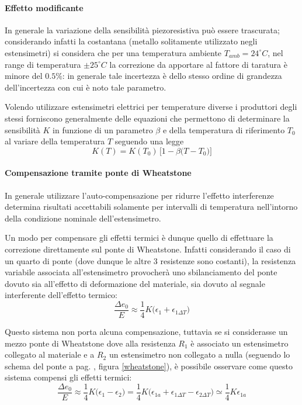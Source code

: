 		\paragraph{Effetto modificante} In generale la variazione della sensibilità piezoresistiva può essere trascurata; considerando infatti la costantana (metallo solitamente utilizzato negli estensimetri) si considera che per una temperatura ambiente $T_{amb} = 24^\circ C$, nel range di temperatura $\pm 25^\circ C$ la correzione da apportare al fattore di taratura è minore del $0.5\%$: in generale tale incertezza è dello stesso ordine di grandezza dell'incertezza con cui è noto tale parametro.
		
		Volendo utilizzare estensimetri elettrici per temperature diverse i produttori degli stessi forniscono generalmente delle equazioni che permettono di determinare la sensibilità $K$ in funzione di un parametro $\beta$ e della temperatura di riferimento $T_0$ al variare della temperatura $T$ seguendo una legge
		\[ K(T) = K(T_0) \, \Big[1 - \beta \big(T-T_0\big)\Big] \]
		
		\paragraph{Compensazione tramite ponte di Wheatstone} In generale utilizzare l'auto-compensazione per ridurre l'effetto interferenze determina risultati accettabili solamente per intervalli di temperatura nell'intorno della condizione nominale dell'estensimetro. 
		
		Un modo per compensare gli effetti termici è dunque quello di effettuare la correzione direttamente sul ponte di Wheatstone. Infatti considerando il caso di un quarto di ponte (dove dunque le altre 3 resistenze sono costanti), la resistenza variabile associata all'estensimetro provocherà uno sbilanciamento del ponte dovuto sia all'effetto di deformazione del materiale, sia dovuto al segnale interferente dell'effetto termico:
		\[ \frac{\Delta e_0}{E} \approx \frac 1 4 K \big(\epsilon_1 + \epsilon_{1\Delta T}\big)  \]
		
		Questo sistema non porta alcuna compensazione, tuttavia se si considerasse un mezzo ponte di Wheatstone dove alla resistenza $R_1$ è associato un estensimetro collegato al materiale e a $R_2$ un estensimetro non collegato a nulla (seguendo lo schema del ponte a pag. \pageref{wheatstone}, figura \ref{wheatstone}), è possibile osservare come questo sistema compensi gli effetti termici:
		\[ \frac{\Delta e_0}E \approx \frac 1 4 K \big(\epsilon_1 - \epsilon_2\big) = \frac 1 4 K \big(\epsilon_{1a} + \epsilon_{1\Delta T} - \epsilon_{2\Delta T}\big) \simeq \frac 1 4 K \epsilon_{1a} \]
		
